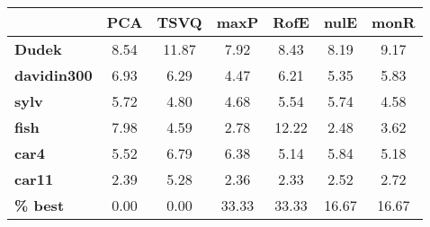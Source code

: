 \begin{tabular}{|l|c|c|c|c|c|c|}
\hline
&\textbf{PCA}&\textbf{TSVQ}&\textbf{maxP}&\textbf{RofE}&\textbf{nulE}&\textbf{monR}\\\hline
\textbf{Dudek}&8.54&11.87&7.92&8.43&8.19&9.17\\\hline
\textbf{davidin300}&6.93&6.29&4.47&6.21&5.35&5.83\\\hline
\textbf{sylv}&5.72&4.80&4.68&5.54&5.74&4.58\\\hline
\textbf{fish}&7.98&4.59&2.78&12.22&2.48&3.62\\\hline
\textbf{car4}&5.52&6.79&6.38&5.14&5.84&5.18\\\hline
\textbf{car11}&2.39&5.28&2.36&2.33&2.52&2.72\\\hline
\textbf{ \% best}&0.00&0.00&33.33&33.33&16.67&16.67\\\hline
\end{tabular}
